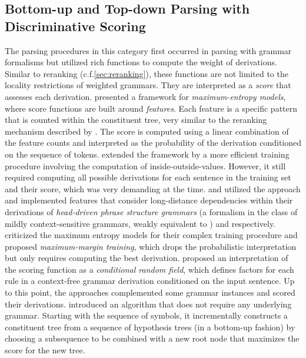 \documentclass[../document.tex]{subfiles}
\begin{document}
    \subsection{Bottom-up and Top-down Parsing with Discriminative Scoring}\label{sec:literature:chart}
    The parsing procedures in this category first occurred in parsing with grammar formalisms but utilized rich functions to compute the weight of derivations.
    Similar to reranking (c.f.\@ \cref{sec:reranking}), these functions are not limited to the locality restrictions of weighted grammars.
    They are interpreted as a \emph{score} that assesses each derivation.
     presented a framework for \emph{maximum-entropy models}, where score functions are built around \emph{features}.
    Each feature is a specific pattern that is counted within the constituent tree, very similar to the reranking mechanism described by \citet{collins2001convolution}.
    The score is computed using a linear combination of the feature counts and interpreted as the probability of the derivation conditioned on the sequence of tokens.
     extended the framework by a more efficient training procedure involving the computation of inside-outside-values.
    However, it still required computing all possible derivations for each sentence in the training set and their score, which was very demanding at the time.
     and \citet{Clark04a} utilized the approach and implemented features that consider long-distance dependencies within their derivations of \emph{head-driven phrase structure grammars} (a formalism in the class of mildly context-sensitive grammars, weakly equivalent to ) and  respectively.
     criticized the maximum entropy models for their complex training procedure and proposed \emph{maximum-margin training}, which drops the probabilistic interpretation but only requires computing the best derivation.
     proposed an interpretation of the scoring function as a \emph{conditional random field}, which defines factors for each rule in a context-free grammar derivation conditioned on the input sentence.
    Up to this point, the approaches complemented some grammar instances and scored their derivations.
     introduced an algorithm that does not require any underlying grammar.
    Starting with the sequence of  symbols, it incrementally constructs a constituent tree from a sequence of hypothesis trees (in a bottom-up fashion) by choosing a subsequence to be combined with a new root node that maximizes the score for the new tree.
\end{document}
